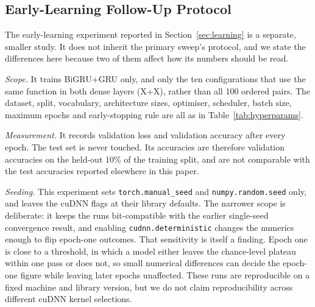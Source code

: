 
\subsection{Early-Learning Follow-Up Protocol}
\label{sec:convergence_protocol}

The early-learning experiment reported in
Section~\ref{sec:learning} is a separate, smaller study. It does
not inherit the primary sweep's protocol, and we state the
differences here because two of them affect how its numbers
should be read.

\textit{Scope.} It trains BiGRU+GRU only, and only the ten
configurations that use the same function in both dense layers
(X+X), rather than all 100 ordered pairs. The dataset, split,
vocabulary, architecture sizes, optimiser, scheduler, batch size,
maximum epochs and early-stopping rule are all as in
Table~\ref{tab:hyperparams}.

\textit{Measurement.} It records validation loss and validation
accuracy after every epoch. The test set is never touched. Its
accuracies are therefore validation accuracies on the held-out
10\% of the training split, and are not comparable with the test
accuracies reported elsewhere in this paper.

\textit{Seeding.} This experiment sets \texttt{torch.manual\_seed}
and \texttt{numpy.random.seed} only, and leaves the cuDNN flags at
their library defaults. The narrower scope is deliberate: it keeps
the runs bit-compatible with the earlier single-seed convergence
result, and enabling \texttt{cudnn.deterministic} changes the
numerics enough to flip epoch-one outcomes. That sensitivity is
itself a finding. Epoch one is close to a threshold, in which a
model either leaves the chance-level plateau within one pass or
does not, so small numerical differences can decide the epoch-one
figure while leaving later epochs unaffected. These runs are
reproducible on a fixed machine and library version, but we do not
claim reproducibility across different cuDNN kernel selections.

